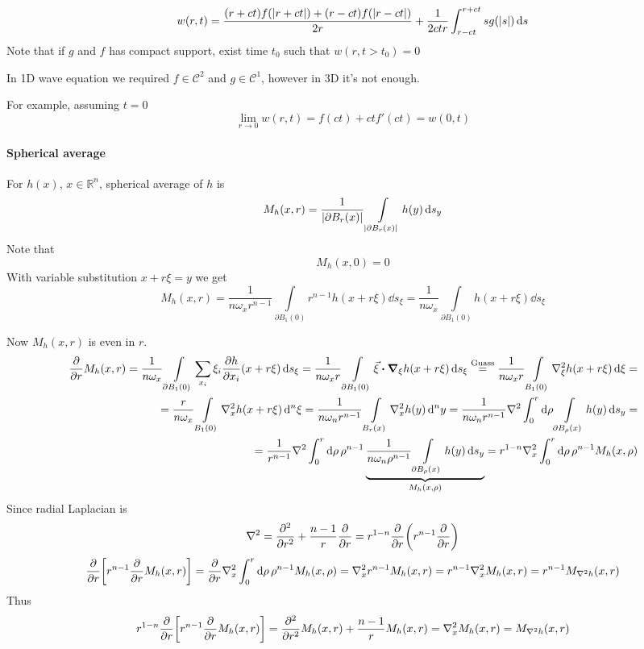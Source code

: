 $$w(r,t) = \frac{(r+ct)f(\abs{r+ct})+ (r-ct)f(\abs{r-ct})}{2r} + \frac{1}{2ctr} \int_{r-ct}^{r+ct} sg(\abs{s}) \dd{s}$$ 
Note that if $g$ and $f$ has compact support, exist time $t_0$ such that
$w(r,t>t_0) = 0$

In 1D wave equation we required $f\in \mathcal{C}^2$ and $g\in \mathcal{C}^1$, however in 3D it's not enough.

For example, assuming $t=0$
$$\lim_{r\to0} w(r,t) = f(ct) + ctf'(ct) = w(0,t)$$

\paragraph{Spherical average}
For $h(x)$, $x\in \mathbb{R}^n$, spherical average of $h$ is
$$M_h(x,r) = \frac{1}{\abs{\partial B_r(x)}} \int\limits_{\abs{\partial B_r(x)}} h(y) \dd{s_y}$$
Note that
$$M_h(x,0) = 0$$
With variable substitution $x+r\xi = y$ we get
$$M_h(x,r) = \frac{1}{n\omega_x r^{n-1}} \int\limits_{\partial B_1(0)} r^{n-1}h(x+r\xi) \dd{s_\xi}= \frac{1}{n\omega_x } \int\limits_{\partial B_1(0)} h(x+r\xi) \dd{s_\xi}$$

Now $M_h(x,r)$ is even in $r$.
\begin{align*}
\pdv{r} M_h(x,r) = \frac{1}{n\omega_x } \int\limits_{\partial B_1(0)}  \sum_{x_i} \xi_i \pdv{h}{x_i}  \qty(x+r\xi) \dd{s_\xi} = \frac{1}{n\omega_x r} \int\limits_{\partial B_1(0)}  \va{\xi} \vdot \grad_{\xi}{h(x+r\xi)} \dd{s_\xi} \stackrel{\text{Guass}}{=} \frac{1}{n\omega_x r} \int\limits_{ B_1(0)}  \laplacian_{\xi}{h(x+r\xi)} \dd{\xi} =\\= \frac{r}{n\omega_x } \int\limits_{ B_1(0)}  \laplacian_{x}{h(x+r\xi)} \dd[n]{\xi} = \frac{1}{n\omega_n r^{n-1}}\int\limits_{ B_r(x)}  \laplacian_x{h(y)} \dd[n]{y} = \frac{1}{n\omega_n r^{n-1}}\laplacian\int_0^r \dd{\rho}\int\limits_{ \partial B_\rho(x)}  h(y) \dd{s_y} =\\= \frac{1}{ r^{n-1}}\laplacian\int_0^r \dd{\rho} \rho^{n-1}\underbrace{\frac{1}{n\omega_n \rho^{n-1}}\int\limits_{ \partial B_\rho(x)}  h(y) \dd{s_y} }_{M_h(x,\rho)} = r^{1-n} \laplacian_x \int_0^r \dd{\rho} \rho^{n-1} M_h(x,\rho)
\end{align*}
Since radial Laplacian is
$$\laplacian = \pdv[2]{r} + \frac{n-1}{r} \pdv{r} = r^{1-n} \pdv{r} \qty(r^{n-1}\pdv{r})$$
$$\pdv{r} \qty[r^{n-1} \pdv{r} M_h(x,r)] = \pdv{r} \laplacian_x \int_0^r \dd{\rho} \rho^{n-1} M_h(x,\rho) = \laplacian_x r^{n-1} M_h(x,r) = r^{n-1} \laplacian_x M_h(x,r) = r^{n-1} M_{\laplacian h} (x,r) $$
Thus
$$r^{1-n} \pdv{r} \qty[r^{n-1} \pdv{r} M_h(x,r)] = \pdv[2]{r} M_h(x,r) + \frac{n-1}{r}M_{h}(x,r) = \laplacian_x M_h(x,r) = M_{\laplacian{h} } (x,r)$$

